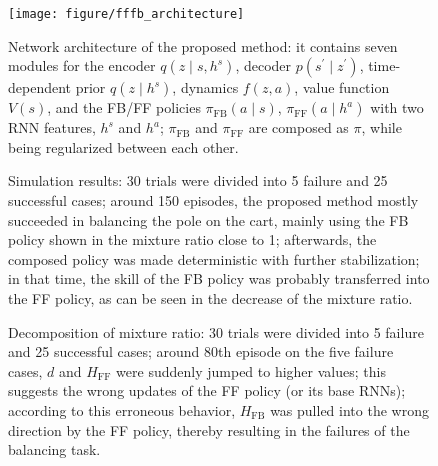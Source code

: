 \documentclass{bmcart}
\begin{document}
\begin{backmatter}
\begin{figure}[!ht]
    \centering
    \texttt{[image: figure/fffb\_architecture]}
    \caption{Network architecture of the proposed method:
    it contains seven modules for the encoder $q(z \mid s, h^s)$, decoder $p(s^\prime \mid z^\prime)$, time-dependent prior $q(z \mid h^s)$, dynamics $f(z, a)$, value function $V(s)$, and the FB/FF policies $\pi_\mathrm{FB}(a \mid s)$, $\pi_\mathrm{FF}(a \mid h^a)$ with two RNN features, $h^s$ and $h^a$;
    $\pi_\mathrm{FB}$ and $\pi_\mathrm{FF}$ are composed as $\pi$, while being regularized between each other.
    }
    \label{fig:fffb_architecture}
\end{figure}

\begin{figure}[!ht]
    \centering
    \centering
    \caption{Simulation results:
    30 trials were divided into 5 failure and 25 successful cases;
    around 150 episodes, the proposed method mostly succeeded in balancing the pole on the cart, mainly using the FB policy shown in the mixture ratio close to 1;
    afterwards, the composed policy was made deterministic with further stabilization;
    in that time, the skill of the FB policy was probably transferred into the FF policy, as can be seen in the decrease of the mixture ratio.
    }
    \label{fig:sim_result}
\end{figure}

\begin{figure}[!ht]
    \centering
    \centering
    \caption{Decomposition of mixture ratio:
    30 trials were divided into 5 failure and 25 successful cases;
    around 80th episode on the five failure cases, $d$ and $H_\mathrm{FF}$ were suddenly jumped to higher values;
    this suggests the wrong updates of the FF policy (or its base RNNs);
    according to this erroneous behavior, $H_\mathrm{FB}$ was pulled into the wrong direction by the FF policy, thereby resulting in the failures of the balancing task.
    }
    \label{fig:sim_analysis}
\end{figure}


\end{backmatter}
\end{document}
